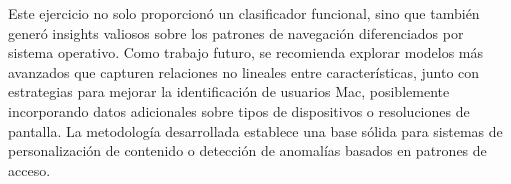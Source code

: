 \documentclass{article}
\begin{document}
Este ejercicio no solo proporcionó un clasificador funcional, sino que también generó insights valiosos sobre los patrones de navegación diferenciados por sistema operativo. Como trabajo futuro, se recomienda explorar modelos más avanzados que capturen relaciones no lineales entre características, junto con estrategias para mejorar la identificación de usuarios Mac, posiblemente incorporando datos adicionales sobre tipos de dispositivos o resoluciones de pantalla. La metodología desarrollada establece una base sólida para sistemas de personalización de contenido o detección de anomalías basados en patrones de acceso.
\end{document}

